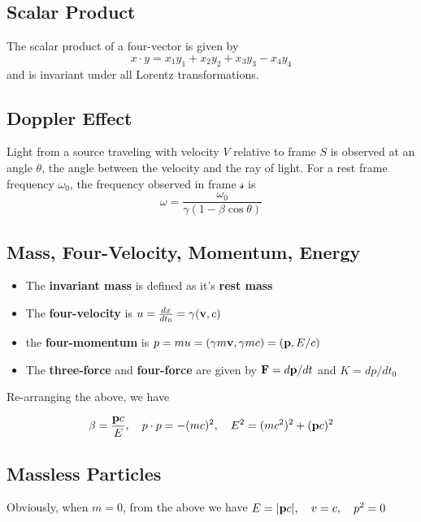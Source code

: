 \documentclass{article}
\begin{document}
\subsection{Scalar Product}
The scalar product of a four-vector is given by 
$$
x \cdot y = x_1 y_1 + x_2 y_2  + x_3 y_3  - x_4 y_4 
$$
and is invariant under all Lorentz transformations.

\subsection{Doppler Effect}
Light from a source traveling with velocity $V$ relative to frame $S$ is observed at an angle $\theta$, the angle between the velocity and the ray of light. For a rest frame frequency $\omega_0$, the frequency observed in frame $\mathcal{s}$ is
$$
\omega = \frac{\omega_0}{\gamma ( 1-\beta \cos \theta)}
$$

\subsection{Mass, Four-Velocity, Momentum, Energy}
\begin{itemize}
    \item The \textbf{invariant mass} is defined as it's \textbf{rest mass}
    \item The \textbf{four-velocity} is $u = \frac{dx}{dt_0} = \gamma ( \vb{v}, c)$
    \item the \textbf{four-momentum} is
    $p = mu = (\gamma m \vb{v}, \gamma m c) = (\vb{p}, E/c)$
    \item The \textbf{three-force} and \textbf{four-force} are given by $\vb{F} = d\vb{p}/dt$ and $K = dp/dt_0$
\end{itemize}

Re-arranging the above, we have 

$$
\beta = \frac{\vb{p}c}{E}, \quad p \cdot p = -(mc)^2, \quad E^2 = (mc^2)^2 + (\vb{p}c)^2
$$

\subsection{Massless Particles}
Obviously, when $m = 0$, from the above we have
$E = |\vb{p}c|, \quad v = c, \quad p^2 = 0$
\end{document}
